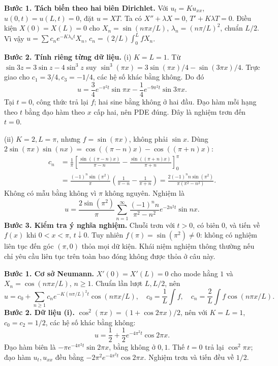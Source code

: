 \textbf{Bước 1. Tách biến theo hai biên Dirichlet.}
Với $u_t=Ku_{xx}$, $u(0,t)=u(L,t)=0$, đặt $u=XT$. Ta có $X''+\lambda X=0$, $T'+K\lambda T=0$. Điều kiện $X(0)=X(L)=0$ cho $X_n=\sin(n\pi x/L)$, $\lambda_n=(n\pi/L)^2$, chuẩn $L/2$. Vì vậy $u=\sum c_ne^{-K\lambda_nt}X_n$, $c_n=(2/L)\int_0^LfX_n$.

\textbf{Bước 2. Tính riêng từng dữ liệu.}
(i) $K=L=1$. Từ $\sin3z=3\sin z-4\sin^3z$ suy $\sin^3(\pi x)=3\sin(\pi x)/4-\sin(3\pi x)/4$. Trực giao cho $c_1=3/4,c_3=-1/4$, các hệ số khác bằng không. Do đó
\[u=\frac34e^{-\pi^2t}\sin\pi x-\frac14e^{-9\pi^2t}\sin3\pi x.\]
Tại $t=0$, công thức trả lại $f$; hai sine bằng không ở hai đầu. Đạo hàm mỗi hạng theo $t$ bằng đạo hàm theo $x$ cấp hai, nên PDE đúng. Đây là nghiệm trơn đến $t=0$.

(ii) $K=2,L=\pi$, nhưng $f=\sin(\pi x)$, không phải $\sin x$. Dùng $2\sin(\pi x)\sin(nx)=\cos((\pi-n)x)-\cos((\pi+n)x)$:
\begin{align*}
c_n&=\frac1\pi\left[\frac{\sin((\pi-n)x)}{\pi-n}-\frac{\sin((\pi+n)x)}{\pi+n}\right]_0^\pi\\
&=\frac{(-1)^n\sin(\pi^2)}{\pi}\left(\frac1{\pi-n}-\frac1{\pi+n}\right)
=\frac{2(-1)^nn\sin(\pi^2)}{\pi(\pi^2-n^2)}.
\end{align*}
Không có mẫu bằng không vì $\pi$ không nguyên. Nghiệm là
\[u=\frac{2\sin(\pi^2)}{\pi}\sum_{n=1}^\infty\frac{(-1)^nn}{\pi^2-n^2}e^{-2n^2t}\sin nx.\]
\textbf{Bước 3. Kiểm tra ý nghĩa nghiệm.} Chuỗi trơn với $t>0$, có biên $0$, và tiến về $f(x)$ khi $0<x<\pi$, $t\downarrow0$. Tuy nhiên $f(\pi)=\sin(\pi^2)\ne0$: không có nghiệm liên tục đến góc $(\pi,0)$ thỏa mọi dữ kiện. Khái niệm nghiệm thông thường nếu chỉ yêu cầu liên tục trên toàn bao đóng không được thỏa ở câu này.

\textbf{Bước 1. Cơ sở Neumann.} $X'(0)=X'(L)=0$ cho mode hằng $1$ và $X_n=\cos(n\pi x/L)$, $n\ge1$. Chuẩn lần lượt $L,L/2$, nên
\[u=c_0+\sum_{n\ge1}c_ne^{-K(n\pi/L)^2t}\cos(n\pi x/L),\quad c_0=\frac1L\int f,\quad c_n=\frac2L\int f\cos(n\pi x/L).\]
\textbf{Bước 2. Dữ liệu (i).} $\cos^2(\pi x)=(1+\cos2\pi x)/2$, nên với $K=L=1$, $c_0=c_2=1/2$, các hệ số khác bằng không:
\[u=\frac12+\frac12e^{-4\pi^2t}\cos2\pi x.\]
Đạo hàm biên là $-\pi e^{-4\pi^2t}\sin2\pi x$, bằng không ở $0,1$. Thế $t=0$ trả lại $\cos^2\pi x$; đạo hàm $u_t,u_{xx}$ đều bằng $-2\pi^2e^{-4\pi^2t}\cos2\pi x$. Nghiệm trơn và tiến đều về $1/2$.

